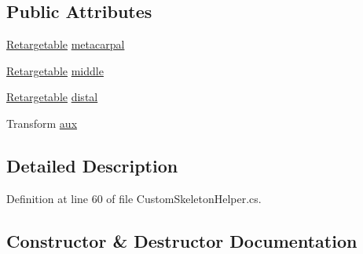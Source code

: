 \subsection*{Public Attributes}
\begin{DoxyCompactItemize}
\item 
\mbox{\hyperlink{class_valve_1_1_v_r_1_1_interaction_system_1_1_sample_1_1_custom_skeleton_helper_1_1_retargetable}{Retargetable}} \mbox{\hyperlink{class_valve_1_1_v_r_1_1_interaction_system_1_1_sample_1_1_custom_skeleton_helper_1_1_thumb_ad15d797cab49703ff5591a6f773b2de0}{metacarpal}}
\item 
\mbox{\hyperlink{class_valve_1_1_v_r_1_1_interaction_system_1_1_sample_1_1_custom_skeleton_helper_1_1_retargetable}{Retargetable}} \mbox{\hyperlink{class_valve_1_1_v_r_1_1_interaction_system_1_1_sample_1_1_custom_skeleton_helper_1_1_thumb_a35306b823b83e537832d0205016d3d43}{middle}}
\item 
\mbox{\hyperlink{class_valve_1_1_v_r_1_1_interaction_system_1_1_sample_1_1_custom_skeleton_helper_1_1_retargetable}{Retargetable}} \mbox{\hyperlink{class_valve_1_1_v_r_1_1_interaction_system_1_1_sample_1_1_custom_skeleton_helper_1_1_thumb_a1d105532ec423af7ee332b7b8e857c8d}{distal}}
\item 
Transform \mbox{\hyperlink{class_valve_1_1_v_r_1_1_interaction_system_1_1_sample_1_1_custom_skeleton_helper_1_1_thumb_ab8f9e9e193f6f7dd690395785d47c577}{aux}}
\end{DoxyCompactItemize}


\subsection{Detailed Description}


Definition at line 60 of file Custom\+Skeleton\+Helper.\+cs.



\subsection{Constructor \& Destructor Documentation}
\mbox{\label{class_valve_1_1_v_r_1_1_interaction_system_1_1_sample_1_1_custom_skeleton_helper_1_1_thumb_ac49e4c7464e3acbbc0558331012e0e73}} 
